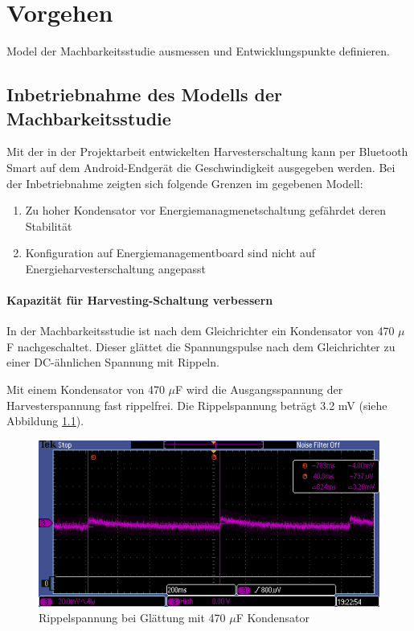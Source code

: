 \chapter{Vorgehen}
Model der Machbarkeitsstudie ausmessen und Entwicklungspunkte definieren.

\section{Inbetriebnahme des Modells der Machbarkeitsstudie}
Mit der in der Projektarbeit entwickelten Harvesterschaltung kann per Bluetooth Smart auf dem Android-Endgerät die Geschwindigkeit ausgegeben werden.
Bei der Inbetriebnahme zeigten sich folgende Grenzen im gegebenen Modell:

\begin{enumerate}
    \item Zu hoher Kondensator vor Energiemanagmenetschaltung gefährdet deren Stabilität
    \item Konfiguration auf Energiemanagementboard sind nicht auf Energieharvesterschaltung angepasst
\end{enumerate}


\subsubsection{Kapazität für Harvesting-Schaltung verbessern}

In der Machbarkeitsstudie ist nach dem Gleichrichter ein Kondensator von 470 $\mu$F nachgeschaltet. Dieser glättet die Spannungspulse nach dem Gleichrichter zu einer DC-ähnlichen Spannung mit Rippeln.

Mit einem Kondensator von 470 $\mu$F wird die Ausgangsspannung der Harvesterspannung fast rippelfrei. Die Rippelspannung beträgt 3.2 mV (siehe Abbildung \ref{kond470uF}).

\begin{figure}
    \includegraphics[scale = 0.6]{3Vorgehen/imag/470uF.PNG}
    \caption{Rippelspannung bei Glättung mit 470 $\mu$F Kondensator}\label{kond470uF} 
\end{figure}

